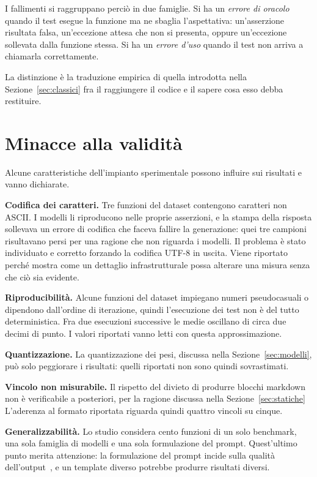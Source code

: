 I fallimenti si raggruppano perciò in due famiglie. Si ha un \emph{errore di
oracolo} quando il test esegue la funzione ma ne sbaglia l'aspettativa:
un'asserzione risultata falsa, un'eccezione attesa che non si presenta, oppure
un'eccezione sollevata dalla funzione stessa. Si ha un \emph{errore d'uso}
quando il test non arriva a chiamarla correttamente.

La distinzione è la traduzione empirica di quella introdotta nella
Sezione~\ref{sec:classici} fra il raggiungere il codice e il sapere cosa esso
debba restituire.

\section{Minacce alla validità}
\label{sec:minacce}
Alcune caratteristiche dell'impianto sperimentale possono influire sui risultati
e vanno dichiarate.

\textbf{Codifica dei caratteri.} Tre funzioni del dataset contengono caratteri
non ASCII. I modelli li riproducono nelle proprie asserzioni, e la stampa della
risposta sollevava un errore di codifica che faceva fallire la generazione: quei
tre campioni risultavano persi per una ragione che non riguarda i modelli. Il
problema è stato individuato e corretto forzando la codifica UTF-8 in uscita.
Viene riportato perché mostra come un dettaglio infrastrutturale possa alterare
una misura senza che ciò sia evidente.

\textbf{Riproducibilità.} Alcune funzioni del dataset impiegano numeri
pseudocasuali o dipendono dall'ordine di iterazione, quindi l'esecuzione dei
test non è del tutto deterministica. Fra due esecuzioni successive le medie
oscillano di circa due decimi di punto. I valori riportati vanno letti con
questa approssimazione.

\textbf{Quantizzazione.} La quantizzazione dei pesi, discussa nella Sezione~\ref{sec:modelli}, può solo peggiorare i risultati: quelli riportati non sono quindi sovrastimati.

\textbf{Vincolo non misurabile.} Il rispetto del divieto di produrre blocchi
markdown non è verificabile a posteriori, per la ragione discussa nella
Sezione~\ref{sec:statiche} L'aderenza al formato riportata riguarda quindi
quattro vincoli su cinque.

\textbf{Generalizzabilità.} Lo studio considera cento funzioni di un solo
benchmark, una sola famiglia di modelli e una sola formulazione del prompt.
Quest'ultimo punto merita attenzione: la formulazione del prompt incide sulla
qualità dell'output~\cite{tony2025prompt}, e un template diverso potrebbe
produrre risultati diversi.
